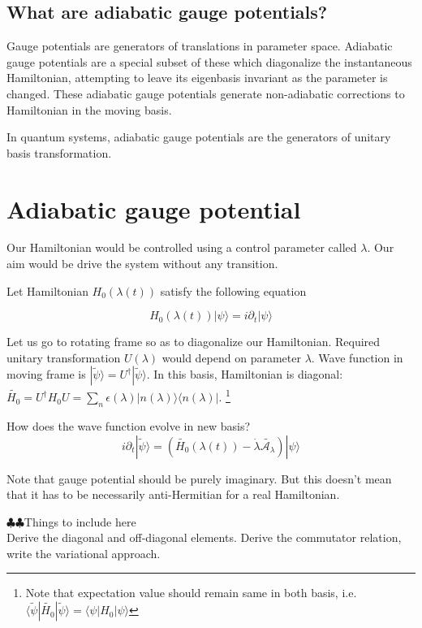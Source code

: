 \documentclass[11pt,a4paper]{article}
\begin{document}
\subsection{What are adiabatic gauge potentials?}
Gauge potentials are generators of translations in parameter space. Adiabatic gauge potentials are a special subset of these which diagonalize  the instantaneous Hamiltonian, attempting to leave its eigenbasis invariant as the parameter is changed. These adiabatic gauge potentials generate non-adiabatic corrections to Hamiltonian in the moving basis.


In quantum systems, adiabatic gauge potentials are the generators of unitary basis transformation. 
\section{Adiabatic gauge potential}
Our Hamiltonian would be controlled using a control parameter called $\lambda$. Our aim would be drive the system without any transition.

Let Hamiltonian $H_0(\lambda (t))$ satisfy the following equation

\begin{equation}
H_0(\lambda (t)) |\psi \rangle= i \partial_t|\psi \rangle
\end{equation}

Let us go to rotating frame so as to diagonalize our Hamiltonian. Required unitary transformation $U(\lambda)$ would depend on parameter $\lambda$. Wave function in moving frame is $|\tilde{\psi}  \rangle = U^{\dagger} |\tilde{\psi}  \rangle$. In this basis, Hamiltonian is diagonal:
$\tilde{H_0}= U^{\dagger} H_0 U = \sum_n \epsilon (\lambda)  |n (\lambda)\rangle \langle  n (\lambda) |$. \footnote{Note that expectation value should remain same in both basis, i.e.$ \langle \tilde{\psi} | \tilde{H_0}  |\tilde{\psi}  \rangle= \langle{\psi} | {H_0}  |{\psi}  \rangle$}

How does the wave function evolve in new basis?
\begin{equation}
 i \partial_t|\tilde{\psi} \rangle=(\tilde{H_0
 }(\lambda (t)) - \dot{\lambda} \tilde{\mathcal{A_\lambda}}) |\psi \rangle
\end{equation}

Note that gauge potential should be purely imaginary. But this doesn't mean that it has to be necessarily anti-Hermitian for a real Hamiltonian.

$\clubsuit \clubsuit $Things to include here \\
Derive the diagonal and off-diagonal elements. Derive the commutator relation, write the variational approach.
\end{document}
